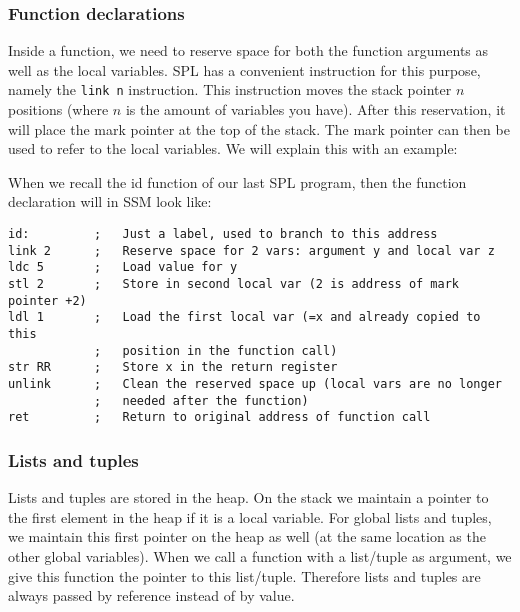 \documentclass[a4paper]{article}
\begin{document}
\subsubsection{Function declarations}
Inside a function, we need to reserve space for both the function arguments as well as the local variables. SPL has a convenient instruction for this purpose, namely the {\tt link n} instruction. This instruction moves the stack pointer $n$ positions (where $n$ is the amount of variables you have). After this reservation, it will place the mark pointer at the top of the stack. The mark pointer can then be used to refer to the local variables. We will explain this with an example:

When we recall the id function of our last SPL program, then the function declaration will in SSM look like:
\begin{lstlisting}
id:			;	Just a label, used to branch to this address
link 2		;	Reserve space for 2 vars: argument y and local var z
ldc 5		;	Load value for y
stl 2		;	Store in second local var (2 is address of mark pointer +2)
ldl 1		;	Load the first local var (=x and already copied to this 
			;	position in the function call)
str RR		;	Store x in the return register
unlink		;	Clean the reserved space up (local vars are no longer 
			;	needed after the function)
ret			;	Return to original address of function call
\end{lstlisting}

\subsubsection{Lists and tuples}
Lists and tuples are stored in the heap. On the stack we maintain a pointer to the first element in the heap if it is a local variable. For global lists and tuples, we maintain this first pointer on the heap as well (at the same location as the other global variables). When we call a function with a list/tuple as argument, we give this function the pointer to this list/tuple. Therefore lists and tuples are always passed by reference instead of by value. 
\end{document}
